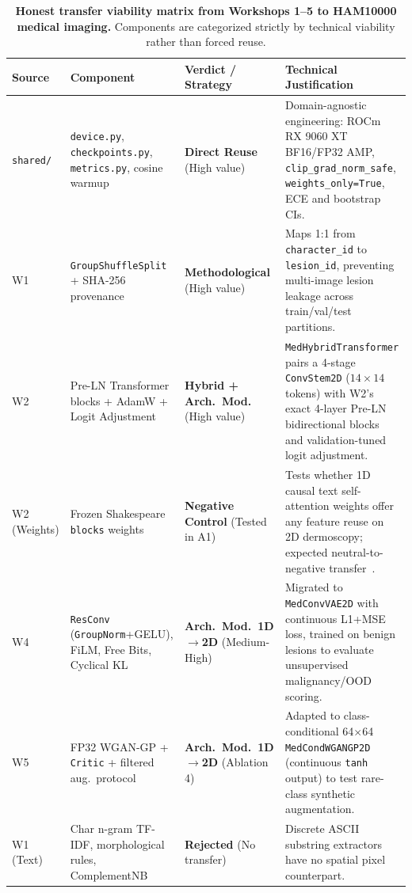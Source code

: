 \begin{table}[htbp]
\centering
\caption{\textbf{Honest transfer viability matrix from Workshops 1--5 to HAM10000 medical imaging.} Components are categorized strictly by technical viability rather than forced reuse.}
\label{tab:transfer_audit}
\footnotesize
\begin{tabular}{p{1.6cm}p{3.4cm}p{2.3cm}p{6.8cm}}
\toprule
\textbf{Source} & \textbf{Component} & \textbf{Verdict / Strategy} & \textbf{Technical Justification} \\
\midrule
\texttt{shared/} & \texttt{device.py}, \texttt{checkpoints.py}, \texttt{metrics.py}, cosine warmup & \textbf{Direct Reuse} (High value) & Domain-agnostic engineering: ROCm RX 9060 XT BF16/FP32 AMP, \texttt{clip\_grad\_norm\_safe}, \texttt{weights\_only=True}, ECE and bootstrap CIs. \\
W1 & \texttt{GroupShuffleSplit} + SHA-256 provenance & \textbf{Methodological} (High value) & Maps 1:1 from \texttt{character\_id} to \texttt{lesion\_id}, preventing multi-image lesion leakage across train/val/test partitions. \\
W2 & Pre-LN Transformer blocks + AdamW + Logit Adjustment & \textbf{Hybrid + Arch.\ Mod.} (High value) & \texttt{MedHybridTransformer} pairs a 4-stage \texttt{ConvStem2D} ($14\times 14$ tokens) with W2's exact 4-layer Pre-LN bidirectional blocks and validation-tuned logit adjustment. \\
W2 (Weights) & Frozen Shakespeare \texttt{blocks} weights & \textbf{Negative Control} (Tested in A1) & Tests whether 1D causal text self-attention weights offer any feature reuse on 2D dermoscopy; expected neutral-to-negative transfer~\cite{Raghu2019transfusion}. \\
W4 & \texttt{ResConv} (\texttt{GroupNorm}+GELU), FiLM, Free Bits, Cyclical KL & \textbf{Arch.\ Mod.\ 1D$\to$2D} (Medium-High) & Migrated to \texttt{MedConvVAE2D} with continuous L1+MSE loss, trained on benign lesions to evaluate unsupervised malignancy/OOD scoring. \\
W5 & FP32 WGAN-GP + \texttt{Critic} + filtered aug.\ protocol & \textbf{Arch.\ Mod.\ 1D$\to$2D} (Ablation 4) & Adapted to class-conditional 64$\times$64 \texttt{MedCondWGANGP2D} (continuous \texttt{tanh} output) to test rare-class synthetic augmentation. \\
\midrule
W1 (Text) & Char n-gram TF-IDF, morphological rules, ComplementNB & \textbf{Rejected} (No transfer) & Discrete ASCII substring extractors have no spatial pixel counterpart. \\

\end{tabular}
\end{table}
